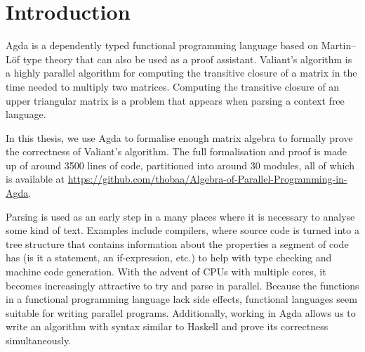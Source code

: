 \chapter{Introduction}
Agda is a dependently typed functional programming language based on Martin--Löf type theory that can also be used as a proof assistant. Valiant's algorithm is a highly parallel algorithm for computing the transitive closure of a matrix in the time needed to multiply two matrices. Computing the transitive closure of an upper triangular matrix is a problem that appears when parsing a context free language.

In this thesis, we use Agda to formalise enough matrix algebra to formally prove the correctness of Valiant's algorithm.
The full formalisation and proof is made up of around 3500 lines of code, partitioned into around 30 modules, all of which is available at \url{https://github.com/thobaa/Algebra-of-Parallel-Programming-in-Agda}.

% 


Parsing is used as an early step in a many places where it is necessary to analyse some kind of text. Examples include compilers, where source code is turned into a tree structure that contains information about the properties a segment of code has (is it a statement, an if-expression, etc.) to help with type checking and machine code generation.
With the advent of CPUs with multiple cores, it becomes increasingly attractive to try and parse in parallel.
Because the functions in a functional programming language lack side effects, functional languages seem suitable for writing parallel programs.
Additionally, working in Agda allows us to write an algorithm with syntax similar to Haskell and prove its correctness simultaneously.

